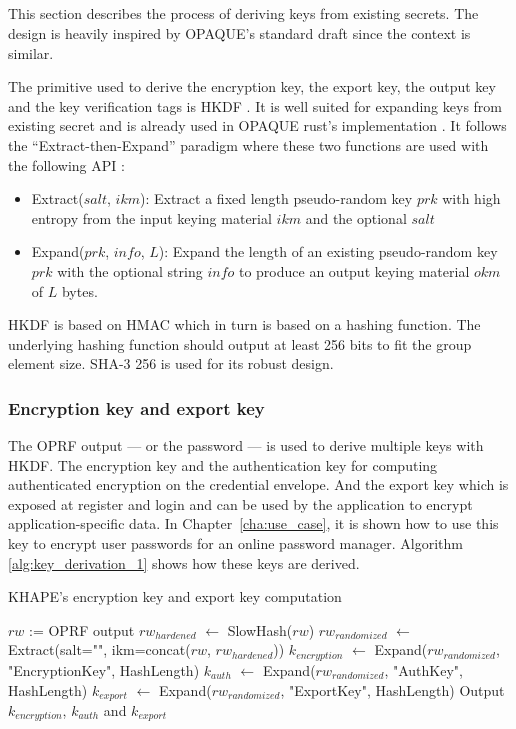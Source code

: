 ﻿\documentclass[../report.tex]{subfiles}
\begin{document}
\subsection{}
This section describes the process of deriving keys from existing secrets. The design is heavily inspired by OPAQUE's standard draft \cite{OPAQUE_Standard_Draft} since the context is similar.

The primitive used to derive the encryption key, the export key, the output key and the key verification tags is HKDF \cite{HKDF_RFC}. It is well suited for expanding keys from existing secret and is already used in OPAQUE rust's implementation \cite{OPAQUE_KE_lib}. It follows the ``Extract-then-Expand'' paradigm where these two functions are used with the following API :
\begin{itemize}
 \item Extract($salt$, $ikm$): Extract a fixed length pseudo-random key $prk$ with high entropy from the input keying material $ikm$ and the optional $salt$
 \item Expand($prk$, $info$, $L$): Expand the length of an existing pseudo-random key $prk$ with the optional string $info$ to produce an output keying material $okm$ of $L$ bytes.
\end{itemize}
HKDF is based on HMAC which in turn is based on a hashing function. The underlying hashing function should output at least 256 bits to fit the group element size. SHA-3 256 is used for its robust design.

\subsubsection{Encryption key and export key}
\label{sec:encryption_key}
The OPRF output --- or the password --- is used to derive multiple keys with HKDF. The encryption key and the authentication key for computing authenticated encryption on the credential envelope. And the export key which is exposed at register and login and can be used by the application to encrypt application-specific data. In Chapter~\ref{cha:use_case}, it is shown how to use this key to encrypt user passwords for an online password manager.
Algorithm \ref{alg:key_derivation_1} shows how these keys are derived.
\begin{algorithm}
\caption{KHAPE's encryption key and export key computation}
\label{alg:key_derivation_1}
\begin{algorithmic}
\Require $rw$ := OPRF output
\State $rw_{hardened}$ $\gets$ SlowHash($rw$)
\State $rw_{randomized}$ $\gets$ Extract(salt="", ikm=concat($rw$, $rw_{hardened}$))
\State $k_{encryption}$ $\gets$ Expand($rw_{randomized}$, "EncryptionKey", HashLength)
\State $k_{auth}$ $\gets$ Expand($rw_{randomized}$, "AuthKey", HashLength)
\State $k_{export}$ $\gets$ Expand($rw_{randomized}$, "ExportKey", HashLength)
\State Output $k_{encryption}$, $k_{auth}$ and $k_{export}$
\end{algorithmic}
\end{algorithm}
\end{document}
